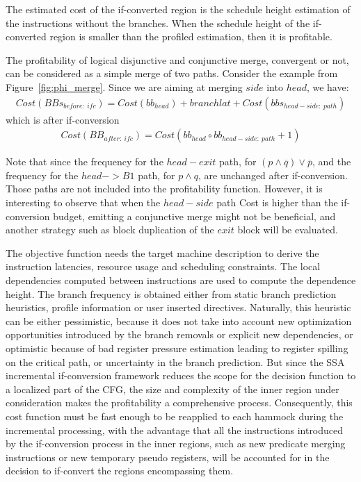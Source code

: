 The estimated cost of the if-converted region is the schedule height estimation of the instructions without the branches. When the schedule height of the if-converted region is smaller than the profiled estimation, then it is profitable.

The profitability of logical disjunctive and conjunctive merge, convergent or not, can be considered as a simple merge of two paths. Consider the example from Figure~\ref{fig:phi_merge}. Since we are aiming at merging $side$ into $head$, we have:
\begin{align*}
Cost(BBs_{before:\ ifc})=Cost(bb_{head}) + branchlat + Cost(bbs_{head-side:\ path})
\end{align*}
which is after if-conversion
\begin{align*}
Cost(BB_{after:\ ifc})=Cost(bb_{head} \circ bb_{head-side:\ path} +1)
\end{align*}

Note that since the frequency for the $head-exit$ path, for $(p\wedge \overline{q})\vee \overline{p}$, and the frequency for the $head->B1$ path, for $p\wedge q$, are unchanged after if-conversion. Those paths are not included into the profitability function.
However, it is interesting to observe that when the $head-side$ path Cost is higher than the if-conversion budget, emitting a conjunctive merge might not be beneficial, and another strategy such as block duplication of the $exit$ block will be evaluated.

The objective function needs the target machine description to derive the instruction latencies, resource usage and scheduling constraints. The local dependencies computed between instructions are used to compute the dependence height. The branch frequency is obtained either from static branch prediction heuristics, profile information or user inserted directives. Naturally, this heuristic can be either pessimistic, because it does not take into account new optimization opportunities introduced by the branch removals or explicit new dependencies, or optimistic because of bad register pressure estimation leading to register spilling on the critical path, or uncertainty in the branch prediction. But since the SSA incremental if-conversion framework reduces the scope for the decision function to a localized part of the CFG, the size and complexity of the inner region under consideration makes the profitability a comprehensive process. Consequently, this cost function must be fast enough to be reapplied to each hammock during the incremental processing, with the advantage that all the instructions introduced by the if-conversion process in the inner regions, such as new predicate merging instructions or new temporary pseudo registers, will be accounted for in the decision to if-convert the regions encompassing them.

